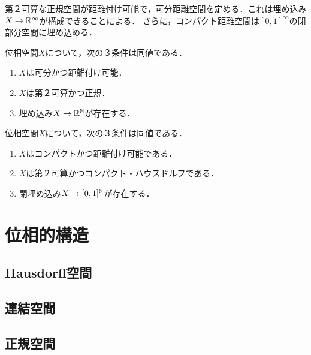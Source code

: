 \documentclass[uplatex,dvipdfmx]{jsreport}
\begin{document}
\begin{tcolorbox}[colframe=ForestGreen, colback=ForestGreen!10!white,breakable,colbacktitle=ForestGreen!40!white,coltitle=black,fonttitle=\bfseries\sffamily,
title=]
    第２可算な正規空間が距離付け可能で，可分距離空間を定める．これは埋め込み$X\to\mathbb{R}^\infty$が構成できることによる．
    さらに，コンパクト距離空間は$[0,1]^\infty$の閉部分空間に埋め込める．
\end{tcolorbox}

\begin{theorem}[Urysohnの距離付け定理]
    位相空間$X$について，次の３条件は同値である．
    \begin{enumerate}
        \item $X$は可分かつ距離付け可能．
        \item $X$は第２可算かつ正規．
        \item 埋め込み$X\to\mathbb{R}^{\mathbb{N}}$が存在する．
    \end{enumerate}
\end{theorem}

\begin{corollary}[AC, コンパクト距離空間は閉区間の可算積の閉部分空間と同相である]
    位相空間$X$について，次の３条件は同値である．
    \begin{enumerate}
        \item $X$はコンパクトかつ距離付け可能である．
        \item $X$は第２可算かつコンパクト・ハウスドルフである．
        \item 閉埋め込み$X\to[0,1]^{\mathbb{N}}$が存在する．
    \end{enumerate}
\end{corollary}

\chapter{位相的構造}

\section{Hausdorff空間}

\section{連結空間}

\section{正規空間}
\end{document}
